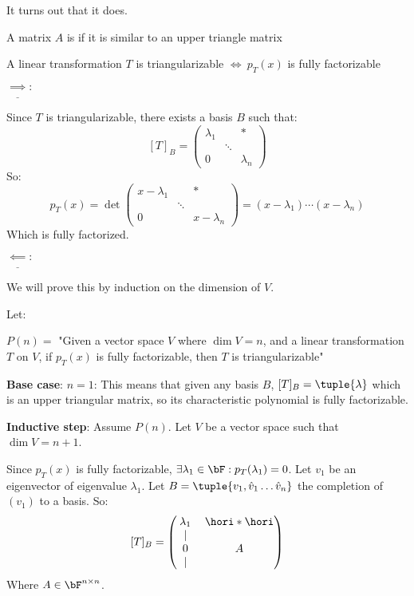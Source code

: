 \documentclass[10pt]{article}
\begin{document}
It turns out that it does. 

\begin{definition*}

A matrix $A$ is  if it is similar to an upper triangle matrix

\end{definition*}

\begin{theorem*}{A linear transformation $T$ is triangularizable $\iff ~ p_T(x)$ is fully factorizable}

$\underline{\implies}:$ \begin{minipage}[t]{\dimexpr\textwidth-2cm}

Since $T$ is triangularizable, there exists a basis $B$ such that:
\[ [T]_B = \begin{pmatrix} \lambda_1 & & * \\ & \ddots & \\ 0 & & \lambda_n \end{pmatrix} \]
So:
\[ p_T(x) = \det\begin{pmatrix} x-\lambda_1 & & * \\ & \ddots & \\ 0 & & x-\lambda_n \end{pmatrix} = (x-\lambda_1)\cdots(x-\lambda_n) \]
Which is fully factorized.

\end{minipage}

$\underline{\impliedby}:$ \begin{minipage}[t]{\dimexpr\textwidth-2cm}

We will prove this by induction on the dimension of $V$.

Let:

$P(n) =$ "Given a vector space $V$ where $\dim V = n$, and a linear transformation $T$ on $V$, if $p_T(x)$ is fully factorizable, then $T$ is triangularizable"

\textbf{Base case}: $n=1$: This means that given any basis $B$, $[T]_B = \tuple{\lambda}$ which is an upper triangular matrix, so its characteristic polynomial is fully factorizable.

\textbf{Inductive step}: Assume $P(n)$. Let $V$ be a vector space such that $\dim V=n+1$.

Since $p_T(x)$ is fully factorizable, $\exists\lambda_1\in\bF: p_T(\lambda_1)=0$. Let $v_1$ be an eigenvector of eigenvalue $\lambda_1$. Let $B=\tuple{v_1,\hat{v}_1\dots \hat{v}_n}$ the completion of $(v_1)$ to a basis. So:
\[ [T]_B = \begin{pmatrix} \lambda_1 & \hori*\hori \\ \begin{array}{c} \vert\\0\\\vert\end{array} & A\end{pmatrix} \]
Where $A\in\bF^{n\times n}$. 


\end{minipage}
\end{theorem*}
\end{document}
